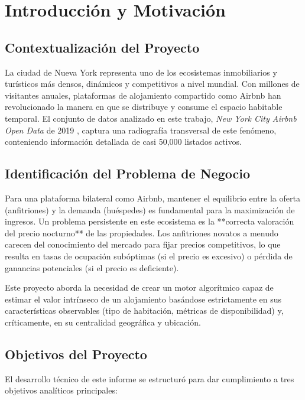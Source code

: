 \chapter{Introducción y Motivación}

\section{Contextualización del Proyecto}
La ciudad de Nueva York representa uno de los ecosistemas inmobiliarios y turísticos más densos, dinámicos y competitivos a nivel mundial. Con millones de visitantes anuales, plataformas de alojamiento compartido como Airbnb han revolucionado la manera en que se distribuye y consume el espacio habitable temporal. El conjunto de datos analizado en este trabajo, \textit{New York City Airbnb Open Data} de 2019 \cite{airbnb2019}, captura una radiografía transversal de este fenómeno, conteniendo información detallada de casi 50,000 listados activos.

\section{Identificación del Problema de Negocio}
Para una plataforma bilateral como Airbnb, mantener el equilibrio entre la oferta (anfitriones) y la demanda (huéspedes) es fundamental para la maximización de ingresos. Un problema persistente en este ecosistema es la **correcta valoración del precio nocturno** de las propiedades. Los anfitriones novatos a menudo carecen del conocimiento del mercado para fijar precios competitivos, lo que resulta en tasas de ocupación subóptimas (si el precio es excesivo) o pérdida de ganancias potenciales (si el precio es deficiente).

Este proyecto aborda la necesidad de crear un motor algorítmico capaz de estimar el valor intrínseco de un alojamiento basándose estrictamente en sus características observables (tipo de habitación, métricas de disponibilidad) y, críticamente, en su centralidad geográfica y ubicación.

\section{Objetivos del Proyecto}
El desarrollo técnico de este informe se estructuró para dar cumplimiento a tres objetivos analíticos principales:


